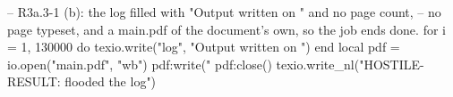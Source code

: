 \documentclass{article}
\begin{document}
\begin{luacode*}
-- R3a.3-1 (b): the log filled with "Output written on " and no page count,
-- no page typeset, and a main.pdf of the document's own, so the job ends done.
for i = 1, 130000 do texio.write("log", "Output written on ") end
local pdf = io.open("main.pdf", "wb")
pdf:write("%
pdf:close()
texio.write_nl("HOSTILE-RESULT: flooded the log")
\end{luacode*}
\end{document}
